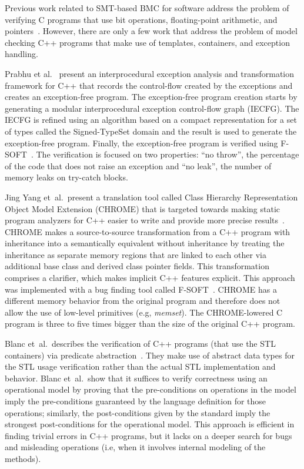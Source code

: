 \documentclass[a4paper]{llncs}
\begin{document}

Previous work related to
SMT-based BMC for software address the problem of verifying C programs
that use bit operations, floating-point arithmetic, and
pointers~\cite{Clarke04,Armando09,Ganai06,Cordeiro12}.
However, there are only a few work that address the problem
of model checking C++ programs that make use of templates, containers,
and exception handling. 

Prabhu et al.~\cite{PrabhuMBIG11} present an interprocedural
exception analysis and transformation framework for C++ that
records the control-flow created by the exceptions
and creates an exception-free program. The exception-free
program creation starts by generating a modular interprocedural
exception control-flow graph (IECFG). The IECFG is refined using
an algorithm based on a compact representation for a set of types
called the Signed-TypeSet domain and the result is used
to generate the exception-free program. Finally, the exception-free
program is verified using F-SOFT~\cite{Fsoft}. The verification is
focused on two properties: ``no throw'', the percentage of the code
that does not raise an exception and ``no leak'', the number of memory
leaks on try-catch blocks.~\cite{PrabhuMBIG11}

Jing Yang et~al.\ present a translation tool called Class Hierarchy
Representation Object Model Extension (CHROME) that is targeted towards
making static program analyzers for C++ easier to write and provide
more precise results~\cite{Yang12}. CHROME makes a source-to-source transformation
from a C++ program with inheritance into a semantically equivalent without
inheritance by treating the inheritance as separate memory regions
that are linked to each other via additional base class and derived class
pointer fields. This transformation comprises a clarifier, which makes
implicit C++ features explicit. This approach was implemented with a bug
finding tool called F-SOFT~\cite{Fsoft}. CHROME has a
different memory behavior from the original program and therefore does not allow
the use of low-level primitives (e.g, \textit{memset}). The CHROME-lowered C program is
three to five times bigger than the size of the original C++ program.

Blanc et~al.\ describes the verification of C++ programs (that use the STL containers)
via predicate abstraction~\cite{Blanc07}. They make use of abstract data types for the STL
usage verification rather than the actual STL implementation and behavior.
Blanc et~al.\ show that it suffices to verify correctness using an operational model
by proving that the pre-conditions on operations in the model imply the pre-conditions
guaranteed by the language definition for those operations; similarly, the post-conditions
given by the standard imply the strongest post-conditions for the operational model.
This approach is efficient in finding trivial errors in C++ programs, but it lacks
on a deeper search for bugs and misleading operations (i.e, when it involves internal
modeling of the methods).
\end{document}
